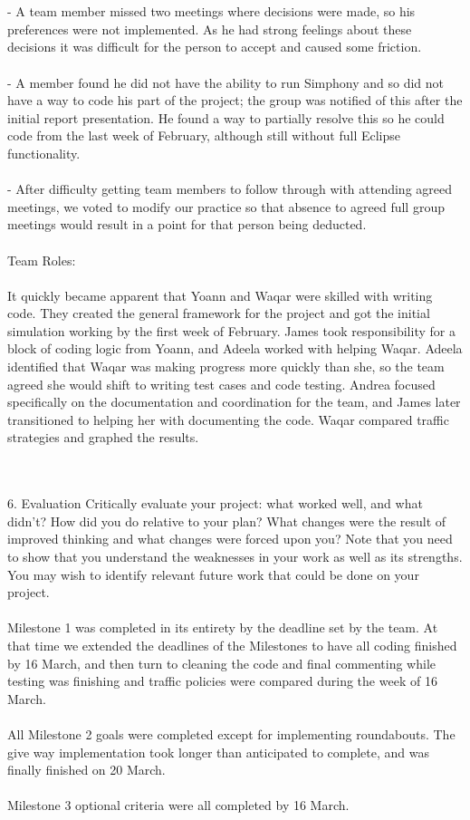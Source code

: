 \documentclass[11pt]{article}
\begin{document}
\\ \\
- A team member missed two meetings where decisions were made, so his preferences were not implemented. As he had strong feelings about these decisions it was difficult for the person to accept and caused some friction.\\ \\
- A member found he did not have the ability to run Simphony and so did not have a way to code his part of the project; the group was notified of this after the initial report presentation. He found a way to partially resolve this so he could code from the last week of February, although still without full Eclipse functionality.
\\ \\
- After difficulty getting team members to follow through with attending agreed meetings, we voted to modify our practice so that absence to agreed full group meetings would result in a point for that person being deducted.
\\ \\
Team Roles:
\\ \\
It quickly became apparent that Yoann and Waqar were skilled with writing code. They created the general framework for the project and got the initial simulation working by the first week of February. James took responsibility for a block of coding logic from Yoann, and Adeela worked with helping Waqar. Adeela identified that Waqar was making progress more quickly than she, so the team agreed she would shift to writing test cases and code testing. Andrea focused specifically on the documentation and coordination for the team, and James later transitioned to helping her with documenting the code. Waqar compared traffic strategies and graphed the results.

\\ \\
6. Evaluation Critically evaluate your project: what worked well, and what didn’t? How did you do relative to your plan? What changes were the result of improved thinking and what changes were forced upon you? Note that you need to show that you understand the weaknesses in your work as well as its strengths. You may wish to identify relevant future work that could be done on your project.
\\ \\

Milestone 1 was completed in its entirety by the deadline set by the team. At that time we extended the deadlines of the Milestones to have all coding finished by 16 March, and then turn to cleaning the code and final commenting while testing was finishing and traffic policies were compared during the week of 16 March.
\\ \\
All Milestone 2 goals were completed except for implementing roundabouts. The give way implementation took longer than anticipated to complete, and was finally finished on 20 March.
\\ \\
Milestone 3 optional criteria were all completed by 16 March. 
\\ \\
\end{document}

